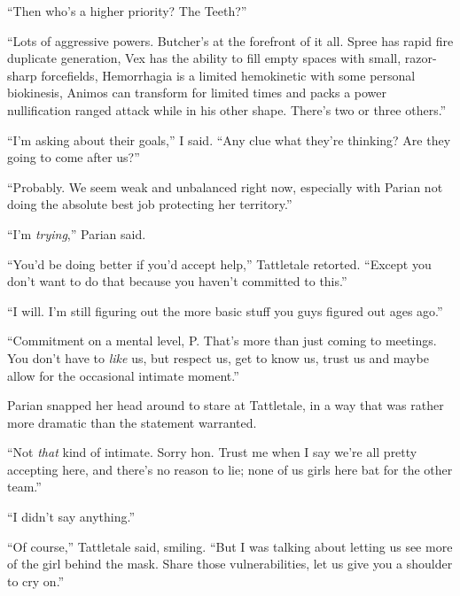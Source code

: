 ``Then who's a higher priority?  The Teeth?''



``Lots of aggressive powers.  Butcher's at the forefront of it all.  Spree has rapid fire duplicate generation, Vex has the ability to fill empty spaces with small, razor-sharp forcefields, Hemorrhagia is a limited hemokinetic with some personal biokinesis, Animos can transform for limited times and packs a power nullification ranged attack while in his other shape.  There's two or three others.''



``I'm asking about their goals,'' I said.  ``Any clue what they're thinking?  Are they going to come after us?''



``Probably.  We seem weak and unbalanced right now, especially with Parian not doing the absolute best job protecting her territory.''



``I'm \emph{trying},'' Parian said.



``You'd be doing better if you'd accept help,'' Tattletale retorted.  ``Except you don't want to do that because you haven't committed to this.''



``I will.  I'm still figuring out the more basic stuff you guys figured out ages ago.''



``Commitment on a mental level, P.  That's more than just coming to meetings.  You don't have to \emph{like} us, but respect us, get to know us, trust us and maybe allow for the occasional intimate moment.''



Parian snapped her head around to stare at Tattletale, in a way that was rather more dramatic than the statement warranted.



``Not \emph{that} kind of intimate.  Sorry hon.  Trust me when I say we're all pretty accepting here, and there's no reason to lie; none of us girls here bat for the other team.''



``I didn't say anything.''



``Of course,'' Tattletale said, smiling.  ``But I was talking about letting us see more of the girl behind the mask.  Share those vulnerabilities, let us give you a shoulder to cry on.''



